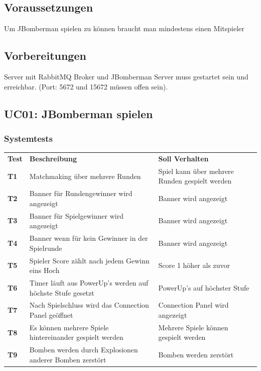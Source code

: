 \documentclass[11pt]{scrartcl}
\begin{document}
\subsection{Voraussetzungen}
Um JBomberman spielen zu können braucht man mindestens einen Mitspieler
\subsection{Vorbereitungen}
Server mit RabbitMQ Broker und JBomberman Server muss gestartet sein und 
erreichbar. 
(Port: 5672 und 15672 müssen offen sein).
\subsection{UC01: JBomberman spielen}
\subsubsection{Systemtests}
\begin{tabularx}{\linewidth}{l X X}
  \bf{Test} & \bf{Beschreibung} & \bf{Soll Verhalten} \\
 \bf{T1} & Matchmaking über mehrere Runden & Spiel kann über mehrere 
 Runden gespielt werden \\
 \bf{T2} & Banner für Rundengewinner wird angezeigt & Banner wird angezeigt \\
 \bf{T3} & Banner für Spielgewinner wird angezeigt & Banner wird angezeigt \\
 \bf{T4} & Banner wenn für kein Gewinner in der Spielrunde & Banner wird 
 angezeigt\\
 \bf{T5} & Spieler Score zählt nach jedem Gewinn eins Hoch & Score 1 höher als 
 zuvor \\
 \bf{T6} & Timer läuft aus PowerUp's werden auf höchste Stufe gesetzt & 
 PowerUp's auf höchster Stufe \\
 \bf{T7} & Nach Spielschluss wird das Connection Panel geöffnet & Connection 
 Panel wird angezeigt\\
 \bf{T8} & Es können mehrere Spiele hintereinander gespielt werden &
 Mehrere Spiele können gespielt werden \\
 \bf{T9} & Bomben werden durch Explosionen anderer Bomben zerstört &
 Bomben werden zerstört \\
 
 \end{tabularx}
\end{document}

